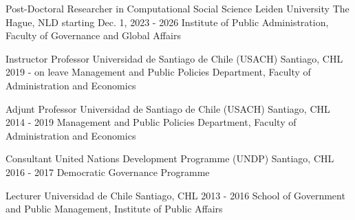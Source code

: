 





\begin{cventries}
\cventry
{Post-Doctoral Researcher in Computational Social Science} 
{Leiden University} 
{The Hague, NLD} 
{starting Dec. 1, 2023 - 2026}
{Institute of Public Administration, Faculty of Governance and Global Affairs} \vspace{1.5mm}

\cventry
{Instructor Professor} 
{Universidad de Santiago de Chile (USACH)} 
{Santiago, CHL} 
{2019 - on leave}
{Management and Public Policies Department, Faculty of Administration and Economics} \vspace{1.5mm}
\end{cventries}


\begin{cventries}
\cventry
{Adjunt Professor} 
{Universidad de Santiago de Chile (USACH)} 
{Santiago, CHL} 
{2014 - 2019}
{Management and Public Policies Department, Faculty of Administration and Economics} \vspace{1.5mm}

\cventry
{Consultant} 
{United Nations Development Programme (UNDP)} 
{Santiago, CHL} 
{2016 - 2017}
{Democratic Governance Programme} \vspace{1.5mm}

\cventry
{Lecturer} 
{Universidad de Chile} 
{Santiago, CHL} 
{2013 - 2016}
{School of Government and Public Management, Institute of Public Affairs}\vspace{1.5mm}
\end{cventries}
